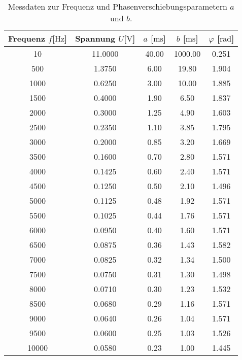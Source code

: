         \begin{table}
            \centering
            \caption{Messdaten zur Frequenz und Phasenverschiebungsparametern $a$ und $b$.}
            \label{tab:freq}
            \begin{tabular}{c c c c c}
                \toprule
                Frequenz $f$[$\si{\hertz}$] & Spannung $U$[$\si{\volt}$] & $a$ [$\si{\milli\second}$] & $b$ [$\si{\milli\second}$] & $\varphi$ [$ \si{\radian}$]  \\
                \midrule
                10      &	11.0000       &       40.00  &       1000.00 & 0.251\\        
                500     &	1.3750        &       6.00   &       19.80   & 1.904  \\
                1000    &	0.6250        &       3.00   &       10.00   & 1.885     \\
                1500    &	0.4000        &       1.90   &       6.50    & 1.837     \\
                2000    &	0.3000        &       1.25   &       4.90    & 1.603     \\  
                2500    &	0.2350        &       1.10   &     3.85      & 1.795   \\   
                3000    &	0.2000        &       0.85   &    3.20       & 1.669\\  
                3500    &	0.1600        &       0.70   &     2.80      & 1.571 \\  
                4000    &	0.1425        &       0.60   &     2.40      & 1.571     \\   
                4500    &	0.1250        &       0.50   &     2.10      & 1.496     \\   
                5000    &	0.1125        &       0.48   &    1.92       & 1.571 \\     
                5500    &	0.1025        &       0.44   &    1.76       & 1.571 \\     
                6000    &	0.0950        &       0.40   &     1.60      & 1.571     \\   
                6500    &	0.0875        &       0.36   &    1.43       & 1.582     \\     
                7000    &	0.0825        &       0.32   &    1.34       & 1.500     \\     
                7500    &	0.0750        &       0.31   &    1.30       & 1.498 \\    
                8000    &	0.0710        &       0.30   &     1.23      & 1.532     \\   
                8500    &	0.0680        &       0.29   &    1.16       & 1.571         \\    
                9000    &	0.0640        &       0.26   &    1.04       & 1.571   \\    
                9500    &	0.0600        &       0.25   &    1.03       & 1.526         \\   
                10000   &	0.0580        &       0.23   &    1.00       & 1.445 \\    
                \bottomrule
            \end{tabular}
            \end{table}